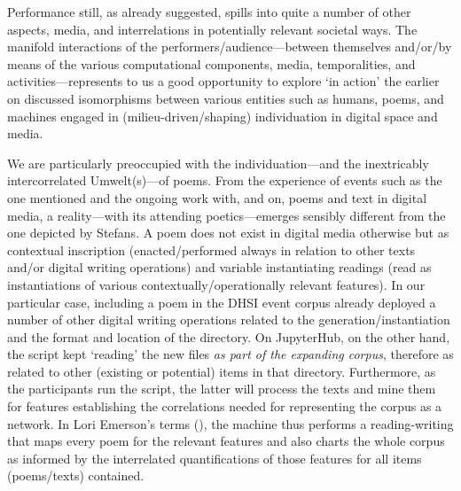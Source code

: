 Performance still, as already suggested, spills into quite a number of
other aspects, media, and interrelations in potentially relevant
societal ways. The manifold interactions of the
performers/audience---between themselves and/or/by means of the various
computational components, media, temporalities, and
activities---represents to us a good opportunity to explore `in action'
the earlier on discussed isomorphisms between various entities such as
humans, poems, and machines engaged in (milieu-driven/shaping)
individuation in digital space and media.

We are particularly preoccupied with the individuation---and the
inextricably intercorrelated Umwelt(s)---of poems. From the experience
of events such as the one mentioned and the ongoing work with, and on,
poems and text in digital media, a reality---with its attending
poetics---emerges sensibly different from the one depicted by Stefans. A
poem does not exist in digital media otherwise but as contextual
inscription (enacted/performed always in relation to other texts and/or
digital writing operations) and variable instantiating readings (read as
instantiation{s} of various contextually/operationally relevant
features). In our particular case, including a poem in the DHSI event
corpus already deployed a number of other digital writing operations
related to the generation/instantiation and the format and location of
the directory. On JupyterHub, on the other hand, the script kept
`reading' the new files \emph{as part of the expanding corpus},
therefore as related to other (existing or potential) items in that
directory. Furthermore, as the participants run the script, the latter
will process the texts and mine them for features establishing the
correlations needed for representing the corpus as a network. In Lori
Emerson's terms (\cite{emerson2014reading}), the machine thus performs a
reading-writing that maps every poem for the relevant features and also
charts the whole corpus as informed by the interrelated quantifications
of those features for all items (poems/texts) contained.

